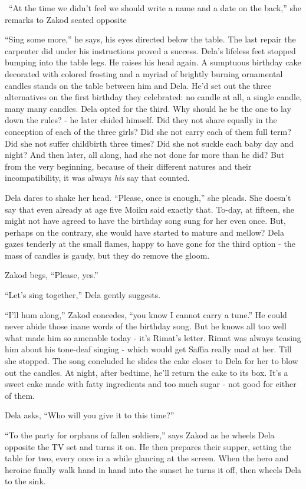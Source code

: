 \documentclass[twoside,11pt]{book}
\begin{document}
\ ``At the time we didn't feel we should write a name and a date on the back,'' she remarks to
Zakod seated opposite

``Sing some more,'' he says, his eyes directed below the table. The last repair the carpenter
did under his instructions proved a success. Dela's lifeless feet stopped bumping into the table legs. He raises his
head again. A sumptuous birthday cake decorated with colored frosting and a myriad of brightly burning ornamental
candles stands on the table between him and Dela. He'd set out the three alternatives on the first birthday they
celebrated: no candle at all, a single candle, many many candles.  Dela opted for the third. Why should he be the one
to lay down the rules? - he later chided himself. Did they not share equally in the conception of each of the three
girls? Did she not carry each of them full term? Did she not suffer childbirth three times? Did she not suckle each
baby day and night? And then later, all along, had she not done far more than he did? But from the very beginning,
because of their different natures and their incompatibility, it was always \textit{his} say that counted.

Dela dares to shake her head. ``Please, once is enough,'' she pleads. She doesn't say that
even already at age five Moiku said exactly that. To-day, at fifteen, she might not have agreed to have the birthday
song sung for her even once. But, perhaps on the contrary, she would have started to mature and mellow? Dela gazes
tenderly at the small flames, happy to have gone for the third option - the mass of candles is gaudy, but they do
remove the gloom.

Zakod begs, ``Please, yes.''

``Let's sing together,'' Dela gently suggests.

``I'll hum along,'' Zakod concedes, ``you know I cannot carry a
tune.'' He could never abide those inane words of the birthday song. But he knows all too well what made
him so amenable today - it's Rimat's letter. Rimat was always teasing him about his tone-deaf singing - which would get
Saffia really mad at her. Till she stopped. The song concluded he slides the cake closer to Dela for her to blow out
the candles. At night, after bedtime, he'll return the cake to its box. It's a sweet cake made with fatty ingredients
and too much sugar - not good for either of them.

Dela asks, ``Who will you give it to this time?''

``To the party for orphans of fallen soldiers,'' says Zakod as he wheels Dela opposite the TV
set and turns it on. He then prepares their supper, setting the table for two, every once in a while glancing at the
screen. When the hero and heroine finally walk hand in hand into the sunset he turns it off, then wheels Dela to the
sink.
\end{document}
